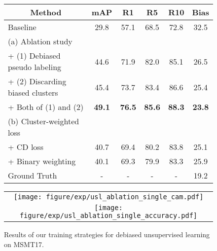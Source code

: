 \begin{figure}[t]
\vspace{-2mm}
\begin{minipage}[c]{0.55\linewidth}
\centering
{
    \scriptsize
    \renewcommand{\arraystretch}{1.1}
    \begin{tabular}{l|ccccc}
        \hline
        \multicolumn{1}{c|}{Method} & 
        mAP & R1 & R5 & R10 & Bias \\ 
        \hline \hline
        
        Baseline & 29.8 & 57.1 & 68.5 & 72.8 & 32.5  \\
        \hline
        
        \multicolumn{1}{l|}{(a) Ablation study} \\
        + (1) Debiased pseudo labeling    & 44.6 & 71.9 & 82.0 & 85.1 & 26.5  \\
        + (2) Discarding biased clusters &  45.4 & 73.7 & 83.4 & 86.6 & 25.4 \\
        + Both of (1) and (2)     & \textbf{49.1} & \textbf{76.5} & \textbf{85.6} & \textbf{88.3} & \textbf{23.8} \\

        \hline
         \multicolumn{1}{l|}{(b) Cluster-weighted loss} \\
        + CD loss~\citep{lee2023camera}   & 40.7 & 69.4 & 80.2 & 83.8 & 25.1 \\
        + Binary weighting   & 40.1 & 69.3 & 79.9 & 83.3 & 25.9 \\
        
        \hdashline
        Ground Truth & - & - & - & - & 19.2 \\
        
        \hline
    \end{tabular}
    }
    \vspace{4pt}
  \end{minipage}\hfill
\begin{minipage}[c]{0.55\linewidth}
\centering
 {\renewcommand{\arraystretch}{0}
  \begin{tabular}{c}
      \texttt{[image: figure/exp/usl\_ablation\_single\_cam.pdf]} 
      \\
      \texttt{[image: figure/exp/usl\_ablation\_single\_accuracy.pdf]} \\
  \end{tabular}}
\end{minipage}
\vspace{-2mm}
\caption{
    Results of our training strategies for debiased unsupervised learning on MSMT17.
}
\label{fig:usl_ablation}
\end{figure}

